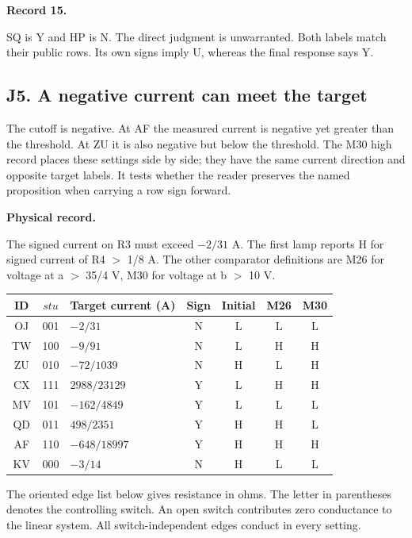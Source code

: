 \documentclass[12pt,letterpaper]{article}
\newcommand{\reading}[2]{\par\smallskip\textsf{\color{accent}\bfseries #1}\enspace #2\par}
\begin{document}
\reading{Record 15.}{} SQ is Y and HP is N. The direct judgment is unwarranted. Both labels match their public rows. Its own signs imply U, whereas the final response says Y.

\clearpage\subsection*{J5. A negative current can meet the target}

The cutoff is negative. At AF the measured current is negative yet greater than the threshold. At ZU it is also negative but below the threshold. The M30 high record places these settings side by side; they have the same current direction and opposite target labels. It tests whether the reader preserves the named proposition when carrying a row sign forward.

\reading{Physical record.}{} The signed current on R3 must exceed $-2/31$ A. The first lamp reports H for signed current of R4 $>$ 1/8 A. The other comparator definitions are M26 for voltage at a $>$ 35/4 V, M30 for voltage at b $>$ 10 V.

\begin{center}{\small\setlength{\tabcolsep}{4pt}\begin{tabularx}{\linewidth}{@{}ccYcccc@{}}\toprule
ID & $stu$ & Target current (A) & Sign & Initial & M26 & M30\\ \midrule
OJ & 001 & $-2/31$ & N & L & L & L\\
TW & 100 & $-9/91$ & N & L & H & H\\
ZU & 010 & $-72/1039$ & N & H & L & H\\
CX & 111 & $2988/23129$ & Y & L & H & H\\
MV & 101 & $-162/4849$ & Y & L & L & L\\
QD & 011 & $498/2351$ & Y & H & H & L\\
AF & 110 & $-648/18997$ & Y & H & H & H\\
KV & 000 & $-3/14$ & N & H & L & L\\
\bottomrule\end{tabularx}}\end{center}

The oriented edge list below gives resistance in ohms. The letter in parentheses denotes the controlling switch. An open switch contributes zero conductance to the linear system. All switch-independent edges conduct in every setting.
\end{document}
